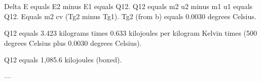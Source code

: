 Delta E equals E2 minus E1 equals Q12.  
Q12 equals m2 u2 minus m1 u1 equals Q12.  
Equals m2 cv (Tg2 minus Tg1).  
Tg2 (from b) equals 0.0030 degrees Celsius.  

Q12 equals 3.423 kilograms times 0.633 kilojoules per kilogram Kelvin times (500 degrees Celsius plus 0.0030 degrees Celsius).  

Q12 equals 1,085.6 kilojoules (boxed).  

---